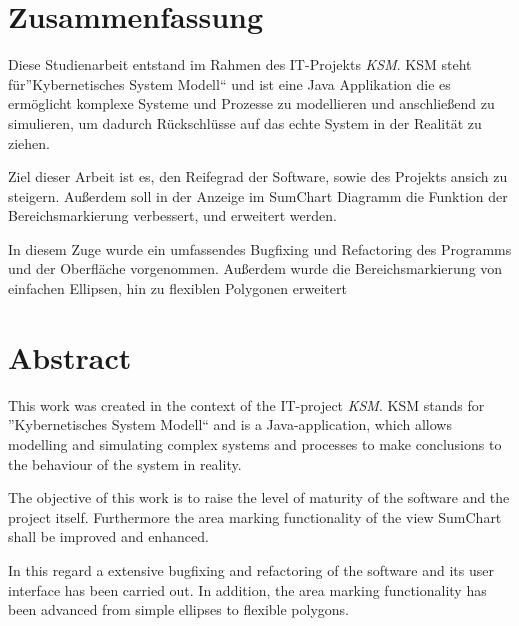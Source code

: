 \section*{Zusammenfassung}

Diese Studienarbeit entstand im Rahmen des IT-Projekts  \emph{KSM}. KSM steht für''Kybernetisches System Modell`` und ist eine Java Applikation die es ermöglicht komplexe Systeme und Prozesse zu modellieren und anschließend zu simulieren, um dadurch Rückschlüsse auf das echte System in der Realität zu ziehen.

Ziel dieser Arbeit ist es, den Reifegrad der Software, sowie des Projekts ansich zu steigern. Außerdem soll in der Anzeige im SumChart Diagramm die Funktion der Bereichsmarkierung verbessert, und erweitert werden.

In diesem Zuge wurde ein umfassendes Bugfixing und Refactoring des Programms und der Oberfläche vorgenommen. Außerdem wurde die Bereichsmarkierung von einfachen Ellipsen, hin zu flexiblen Polygonen erweitert
\newpage
\section*{Abstract}

This work was created in the context of the IT-project \emph{KSM}. KSM stands for ''Kybernetisches System Modell`` and is a Java-application, which allows modelling and simulating complex systems and processes to make conclusions to the behaviour of the system in reality.

The objective of this work is to raise the level of maturity of the software and the project itself. Furthermore the area marking functionality of the view SumChart shall be improved and enhanced.

In this regard a extensive bugfixing and refactoring of the software and its user interface has been carried out. In addition, the area marking functionality has been advanced from simple ellipses to flexible polygons.